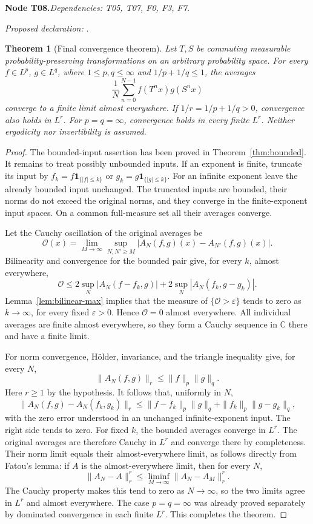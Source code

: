 \documentclass[11pt]{article}
\newtheorem{theorem}{Theorem}[section]
\theoremstyle{remark}\newtheorem{remark}[theorem]{Remark}
\newcommand{\one}{\mathbf1}
\newcommand{\bpnode}[3]{\par\Needspace{5\baselineskip}\noindent\textbf{Node #1.}\quad\textit{Dependencies: #2.}\par\noindent\textit{Proposed declaration:} \texttt{\detokenize{#3}}.\par\smallskip}
\begin{document}
\bpnode{T08}{T05, T07, F0, F3, F7}{commuting_ergodic_averages_converge}
\begin{theorem}[Final convergence theorem]\label{thm:main}
Let $T,S$ be commuting measurable probability-preserving transformations on an arbitrary probability space. For every $f\in L^p$, $g\in L^q$, where $1\le p,q\le\infty$ and $1/p+1/q\le1$, the averages
\[
 \frac1N\sum_{n=0}^{N-1}f(T^nx)g(S^nx)
\]
converge to a finite limit almost everywhere. If $1/r=1/p+1/q>0$, convergence also holds in $L^r$. For $p=q=\infty$, convergence holds in every finite $L^r$. Neither ergodicity nor invertibility is assumed.
\end{theorem}
\begin{proof}
The bounded-input assertion has been proved in Theorem~\ref{thm:bounded}. It remains to treat possibly unbounded inputs. If an exponent is finite, truncate its input by $f_k=f\one_{\{|f|\leq k\}}$ or $g_k=g\one_{\{|g|\leq k\}}$. For an infinite exponent leave the already bounded input unchanged. The truncated inputs are bounded, their norms do not exceed the original norms, and they converge in the finite-exponent input spaces. On a common full-measure set all their averages converge.

Let the Cauchy oscillation of the original averages be
\[
 \mathcal O(x)=\lim_{M\to\infty}\sup_{N,N'\geq M}|A_N(f,g)(x)-A_{N'}(f,g)(x)|.
\]
Bilinearity and convergence for the bounded pair give, for every $k$, almost everywhere,
\[
 \mathcal O\leq2\sup_N|A_N(f-f_k,g)|+2\sup_N|A_N(f_k,g-g_k)|.
\]
Lemma~\ref{lem:bilinear-max} implies that the measure of $\{\mathcal O>\varepsilon\}$ tends to zero as $k\to\infty$, for every fixed $\varepsilon>0$. Hence $\mathcal O=0$ almost everywhere. All individual averages are finite almost everywhere, so they form a Cauchy sequence in $\mathbb C$ there and have a finite limit.

For norm convergence, H\"older, invariance, and the triangle inequality give, for every $N$,
\[
 \|A_N(f,g)\|_r\leq\|f\|_p\|g\|_q.
\]
Here $r\geq1$ by the hypothesis. It follows that, uniformly in $N$,
\[
 \|A_N(f,g)-A_N(f_k,g_k)\|_r
 \leq\|f-f_k\|_p\|g\|_q+\|f_k\|_p\|g-g_k\|_q,
\]
with the zero error understood in an unchanged infinite-exponent input. The right side tends to zero. For fixed $k$, the bounded averages converge in $L^r$. The original averages are therefore Cauchy in $L^r$ and converge there by completeness. Their norm limit equals their almost-everywhere limit, as follows directly from Fatou's lemma: if $A$ is the almost-everywhere limit, then for every $N$,
\[
 \|A_N-A\|_r^r\le\liminf_{M\to\infty}\|A_N-A_M\|_r^r.
\]
The Cauchy property makes this tend to zero as $N\to\infty$, so the two limits agree in $L^r$ and almost everywhere. The case $p=q=\infty$ was already proved separately by dominated convergence in each finite $L^r$. This completes the theorem.
\end{proof}
\end{document}
